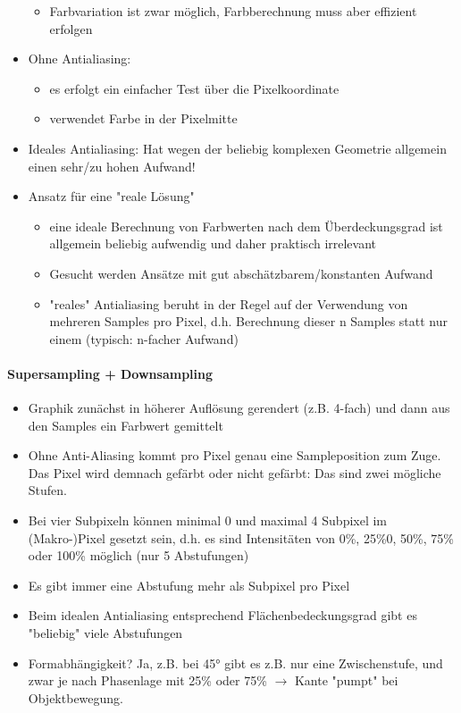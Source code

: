\documentclass[10pt,landscape]{article}
\begin{document}
\begin{multicols}{3}
\begin{itemize}
\begin{itemize}
            \item Farbvariation ist zwar möglich, Farbberechnung muss aber effizient erfolgen
          \end{itemize}
    \item Ohne Antialiasing:
          \begin{itemize}
            \item es erfolgt ein einfacher Test über die Pixelkoordinate
            \item verwendet Farbe in der Pixelmitte
          \end{itemize}
    \item Ideales Antialiasing: Hat wegen der beliebig komplexen Geometrie allgemein einen sehr/zu hohen Aufwand!
    \item Ansatz für eine "reale Lösung"
          \begin{itemize}
            \item eine ideale Berechnung von Farbwerten nach dem Überdeckungsgrad ist allgemein beliebig aufwendig und daher praktisch irrelevant
            \item Gesucht werden Ansätze mit gut abschätzbarem/konstanten Aufwand
            \item "reales" Antialiasing beruht in der Regel auf der Verwendung von mehreren Samples pro Pixel, d.h. Berechnung dieser n Samples statt nur einem (typisch: n-facher Aufwand)
          \end{itemize}
  \end{itemize}
  
  \paragraph{Supersampling + Downsampling}
  \begin{itemize}
    \item Graphik zunächst in höherer Auflösung gerendert (z.B. 4-fach) und dann aus den Samples ein Farbwert gemittelt
    \item Ohne Anti-Aliasing kommt pro Pixel genau eine Sampleposition zum Zuge. Das Pixel wird demnach gefärbt oder nicht gefärbt: Das sind zwei mögliche Stufen.
    \item Bei vier Subpixeln können minimal 0 und maximal 4 Subpixel im (Makro-)Pixel gesetzt sein, d.h. es sind Intensitäten von 0\%, 25\%0, 50\%, 75\% oder 100\% möglich (nur 5 Abstufungen)
    \item Es gibt immer eine Abstufung mehr als Subpixel pro Pixel
    \item Beim idealen Antialiasing entsprechend Flächenbedeckungsgrad gibt es "beliebig" viele Abstufungen
    \item Formabhängigkeit? Ja, z.B. bei 45° gibt es z.B. nur eine Zwischenstufe, und zwar je nach Phasenlage mit 25\% oder 75\% $\rightarrow$ Kante "pumpt" bei Objektbewegung.
  \end{itemize}

\end{multicols}
\end{document}
